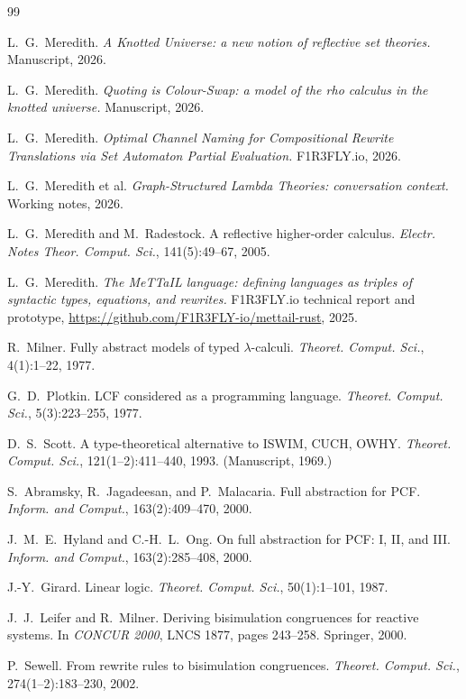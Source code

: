 \documentclass[11pt]{article}
\theoremstyle{plain}
\theoremstyle{definition}
\theoremstyle{remark}
\begin{document}
\begin{thebibliography}{99}

 L.~G.~Meredith. \emph{A Knotted Universe: a new notion of reflective set theories.}
Manuscript, 2026.

 L.~G.~Meredith. \emph{Quoting is Colour-Swap: a model of the rho calculus in the
knotted universe.} Manuscript, 2026.

 L.~G.~Meredith. \emph{Optimal Channel Naming for Compositional Rewrite Translations
via Set Automaton Partial Evaluation.} F1R3FLY.io, 2026.

 L.~G.~Meredith et al. \emph{Graph-Structured Lambda Theories: conversation
context.} Working notes, 2026.

 L.~G.~Meredith and M.~Radestock. A reflective higher-order calculus. \emph{Electr.
Notes Theor. Comput. Sci.}, 141(5):49--67, 2005.

 L.~G.~Meredith. \emph{The MeTTaIL language: defining languages as triples of
syntactic types, equations, and rewrites.} F1R3FLY.io technical report and prototype,
\url{https://github.com/F1R3FLY-io/mettail-rust}, 2025.

 R.~Milner. Fully abstract models of typed $\lambda$-calculi. \emph{Theoret.
Comput. Sci.}, 4(1):1--22, 1977.

 G.~D.~Plotkin. LCF considered as a programming language. \emph{Theoret. Comput.
Sci.}, 5(3):223--255, 1977.

 D.~S.~Scott. A type-theoretical alternative to ISWIM, CUCH, OWHY.
\emph{Theoret. Comput. Sci.}, 121(1--2):411--440, 1993. (Manuscript, 1969.)

 S.~Abramsky, R.~Jagadeesan, and P.~Malacaria. Full abstraction for PCF. \emph{Inform.
and Comput.}, 163(2):409--470, 2000.

 J.~M.~E.~Hyland and C.-H.~L.~Ong. On full abstraction for PCF: I, II, and III.
\emph{Inform. and Comput.}, 163(2):285--408, 2000.

 J.-Y.~Girard. Linear logic. \emph{Theoret. Comput. Sci.}, 50(1):1--101, 1987.

 J.~J.~Leifer and R.~Milner. Deriving bisimulation congruences for reactive
systems. In \emph{CONCUR 2000}, LNCS 1877, pages 243--258. Springer, 2000.

 P.~Sewell. From rewrite rules to bisimulation congruences. \emph{Theoret. Comput.
Sci.}, 274(1--2):183--230, 2002.


\end{thebibliography}
\end{document}

